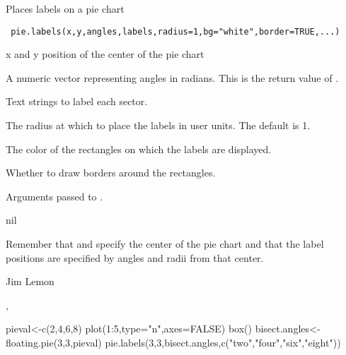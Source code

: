 \begin{Description}\relax
Places labels on a pie chart
\end{Description}
\begin{Usage}
\begin{verbatim}
 pie.labels(x,y,angles,labels,radius=1,bg="white",border=TRUE,...)
\end{verbatim}
\end{Usage}
\begin{Arguments}
\begin{ldescription}
\item[\code{x,y}] x and y position of the center of the pie chart
\item[\code{angles}] A numeric vector representing angles in radians. This is
the return value of .
\item[\code{labels}] Text strings to label each sector.
\item[\code{radius}] The radius at which to place the labels in user units. The
default is 1.
\item[\code{bg}] The color of the rectangles on which the labels are displayed.
\item[\code{border}] Whether to draw borders around the rectangles.
\item[\code{...}] Arguments passed to .
\end{ldescription}
\end{Arguments}
\begin{Value}
nil
\end{Value}
\begin{Note}\relax
Remember that  and  specify the center of the pie chart and
that the label positions are specified by angles and radii from that 
center.
\end{Note}
\begin{Author}\relax
Jim Lemon
\end{Author}
\begin{SeeAlso}\relax
{}, 
\end{SeeAlso}
\begin{Examples}
\begin{ExampleCode}
 pieval<-c(2,4,6,8)
 plot(1:5,type="n",axes=FALSE)
 box()
 bisect.angles<-floating.pie(3,3,pieval)
 pie.labels(3,3,bisect.angles,c("two","four","six","eight"))
\end{ExampleCode}
\end{Examples}

